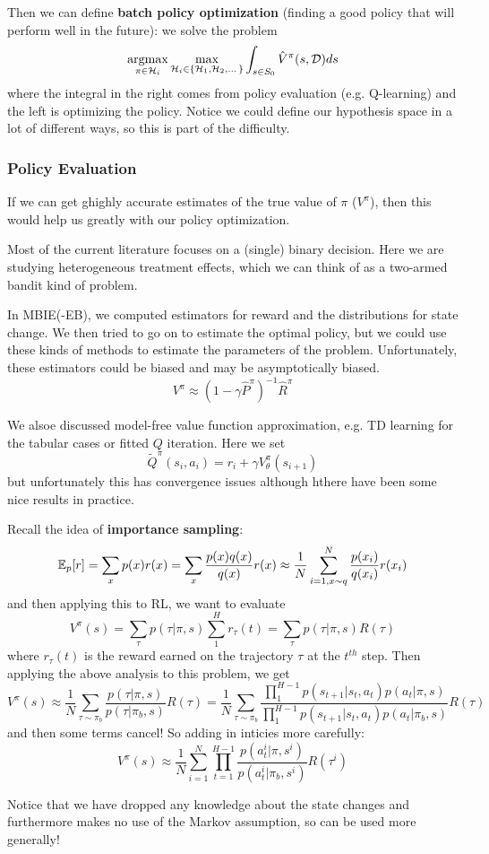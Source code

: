 \documentclass[12pt]{article}
\DeclareMathOperator*{\argmax}{argmax}
\begin{document}
Then we can define \textbf{batch policy optimization} (finding a good policy that will perform well in the future): we solve the problem
\[\argmax_{\pi\in\calH_i}\max_{\calH_i\in\{\calH_1,\calH_2,\dots\}}\int_{s\in S_0}\hat V^\pi(s,\calD)ds\]
where the integral in the right comes from policy evaluation (e.g. Q-learning) and the left is optimizing the policy.
Notice we could define our hypothesis space in a lot of different ways, so this is part of the difficulty.

\subsubsection{Policy Evaluation}
If we can get ghighly accurate estimates of the true value of $\pi$ ($V^\pi$), then this would help us greatly with our policy optimization.

Most of the current literature focuses on a (single) binary decision. Here we are studying heterogeneous treatment effects, which we can think of as a two-armed bandit kind of problem.

In MBIE(-EB), we computed estimators for reward and the distributions for state change. We then tried to go on to estimate the optimal policy, but we could use these kinds of methods to estimate the parameters of the problem.
Unfortunately, these estimators could be biased and may be asymptotically biased.
\[V^\pi\approx (1-\gamma\hat P^\pi)^{-1}\hat R^\pi\]

We alsoe discussed model-free value function approximation, e.g. TD learning for the tabular cases or fitted $Q$ iteration. Here we set 
\[\tilde Q^\pi(s_i,a_i)=r_i+\gamma V_\theta^\pi(s_{i+1})\]
but unfortunately this has convergence issues although hthere have been some nice results in practice.

Recall the idea of \textbf{importance sampling}: 
\[\mathbb{E}_p[r]=\sum_x p(x)r(x)=\sum_x\frac{p(x)q(x)}{q(x)}r(x)\approx\frac{1}{N}\sum_{i=1,x\sim q}^N\frac{p(x_i)}{q(x_i)}r(x_i)\]
and then applying this to RL, we want to evaluate
\[V^\pi(s)=\sum_\tau p(\tau|\pi,s) \sum_1^H r_\tau(t)=\sum_\tau p(\tau|\pi,s)R(\tau)\]
where $r_\tau(t)$ is the reward earned on the trajectory $\tau$ at the $t^{th}$ step. Then applying the above analysis to this problem, we get 
\[V^\pi(s)\approx\frac{1}{N}\sum_{\tau\sim \pi_b}\frac{p(\tau|\pi,s)}{p(\tau|\pi_b,s)}R(\tau)=\frac{1}{N}\sum_{\tau\sim\pi_b}\frac{\prod_1^{H-1}p(s_{t+1}|s_t,a_t)p(a_t|\pi,s)}{\prod_1^{H-1}p(s_{t+1}|s_t,a_t)p(a_t|\pi_b,s)}R(\tau)\]
and then some terms cancel! So adding in inticies more carefully:
\[V^\pi(s)\approx \frac{1}{N}\sum_{i=1}^N\prod_{t=1}^{H-1}\frac{p(a^i_t|\pi, s^i)}{p(a^i_t|\pi_b,s^i)}R(\tau^i)\]
\begin{rmk}
	Notice that we have dropped any knowledge about the state changes and furthermore makes no use of the Markov assumption, so can be used more generally!
\end{rmk}
\end{document}
